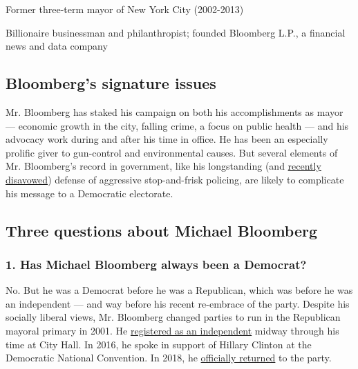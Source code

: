 Former three-term mayor of New York City (2002-2013)

Billionaire businessman and philanthropist; founded Bloomberg L.P., a
financial news and data company

\hypertarget{bloombergs-signature-issues}{%
\subsection{Bloomberg's signature
issues}\label{bloombergs-signature-issues}}

Mr. Bloomberg has staked his campaign on both his accomplishments as
mayor --- economic growth in the city, falling crime, a focus on public
health --- and his advocacy work during and after his time in office. He
has been an especially prolific giver to gun-control and environmental
causes. But several elements of Mr. Bloomberg's record in government,
like his longstanding (and
\href{https://www.nytimes.com/2019/11/17/us/politics/michael-bloomberg-speech.html}{recently
disavowed}) defense of aggressive stop-and-frisk policing, are likely to
complicate his message to a Democratic electorate.

\hypertarget{three-questions-about-michael-bloomberg}{%
\subsection{Three questions about Michael
Bloomberg}\label{three-questions-about-michael-bloomberg}}

\hypertarget{1-has-michael-bloomberg-always-been-a-democrat}{%
\subsubsection{\texorpdfstring{\textbf{1. Has Michael Bloomberg always
been a
Democrat?}}{1. Has Michael Bloomberg always been a Democrat?}}\label{1-has-michael-bloomberg-always-been-a-democrat}}

No. But he was a Democrat before he was a Republican, which was before
he was an independent --- and way before his recent re-embrace of the
party. Despite his socially liberal views, Mr. Bloomberg changed parties
to run in the Republican mayoral primary in 2001. He
\href{https://cityroom.blogs.nytimes.com/2007/06/19/bloomberg-leaving-republican-party/}{registered
as an independent} midway through his time at City Hall. In 2016, he
spoke in support of Hillary Clinton at the Democratic National
Convention. In 2018, he
\href{https://www.nytimes.com/2018/10/10/nyregion/michael-bloomberg-democrat-president.html}{officially
returned} to the party.

